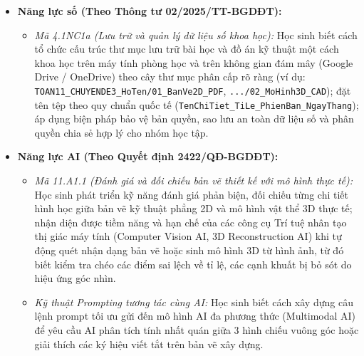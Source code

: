 \documentclass[12pt, a4paper]{article}
\begin{document}
\begin{itemize}[leftmargin=1.2cm]
\begin{itemize}[leftmargin=0.6cm]
        \item \textit{Năng lực sử dụng công cụ, phương tiện học toán:} Khai thác thành thạo bộ dụng cụ vẽ kỹ thuật truyền thống (thước kẻ chia vạch mm, ê-ke $30^\circ - 60^\circ - 90^\circ$, ê-ke $45^\circ$, compa, bút chì kỹ thuật); kết hợp ứng dụng các phần mềm mô hình hóa 3D CAD đơn giản (Tinkercad, SketchUp, Onshape) và trình đọc tệp PDF số trên phòng máy vi tính 35 máy để trực quan hóa góc nhìn.
    \end{itemize}

    \item \textbf{Năng lực số (Theo Thông tư 02/2025/TT-BGDĐT):}
    \begin{itemize}[leftmargin=0.6cm]
        \item \textit{Mã 4.1NC1a (Lưu trữ và quản lý dữ liệu số khoa học):} Học sinh biết cách tổ chức cấu trúc thư mục lưu trữ bài học và đồ án kỹ thuật một cách khoa học trên máy tính phòng học và trên không gian đám mây (Google Drive / OneDrive) theo cây thư mục phân cấp rõ ràng (ví dụ: \texttt{TOAN11\_CHUYENDE3\_HoTen/01\_BanVe2D\_PDF}, \texttt{.../02\_MoHinh3D\_CAD}); đặt tên tệp theo quy chuẩn quốc tế (\texttt{TenChiTiet\_TiLe\_PhienBan\_NgayThang}); áp dụng biện pháp bảo vệ bản quyền, sao lưu an toàn dữ liệu số và phân quyền chia sẻ hợp lý cho nhóm học tập.
    \end{itemize}

    \item \textbf{Năng lực AI (Theo Quyết định 2422/QĐ-BGDĐT):}
    \begin{itemize}[leftmargin=0.6cm]
        \item \textit{Mã 11.A1.1 (Đánh giá và đối chiếu bản vẽ thiết kế với mô hình thực tế):} Học sinh phát triển kỹ năng đánh giá phản biện, đối chiếu từng chi tiết hình học giữa bản vẽ kỹ thuật phẳng 2D và mô hình vật thể 3D thực tế; nhận diện được tiềm năng và hạn chế của các công cụ Trí tuệ nhân tạo thị giác máy tính (Computer Vision AI, 3D Reconstruction AI) khi tự động quét nhận dạng bản vẽ hoặc sinh mô hình 3D từ hình ảnh, từ đó biết kiểm tra chéo các điểm sai lệch về tỉ lệ, các cạnh khuất bị bỏ sót do hiệu ứng góc nhìn.
        \item \textit{Kỹ thuật Prompting tương tác cùng AI:} Học sinh biết cách xây dựng câu lệnh prompt tối ưu gửi đến mô hình AI đa phương thức (Multimodal AI) để yêu cầu AI phân tích tính nhất quán giữa 3 hình chiếu vuông góc hoặc giải thích các ký hiệu viết tắt trên bản vẽ xây dựng.
    \end{itemize}


\end{itemize}
\end{document}
